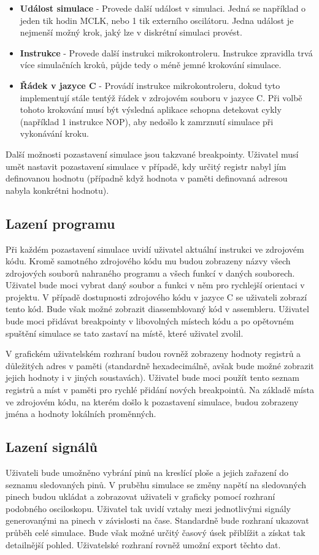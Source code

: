 \begin{itemize}
\item \textbf{Událost simulace} - Provede další událost v simulaci. Jedná se například o jeden tik hodin MCLK, nebo 1 tik externího oscilátoru. Jedna událost je nejmenší možný krok, jaký lze v diskrétní simulaci provést.
\item \textbf{Instrukce} - Provede další instrukci mikrokontroleru. Instrukce zpravidla trvá více simulačních kroků, půjde tedy o méně jemné krokování simulace.
\item \textbf{Řádek v jazyce C} - Provádí instrukce mikrokontroleru, dokud tyto implementují stále tentýž řádek v zdrojovém souboru v jazyce C. Při volbě tohoto krokování musí být výsledná aplikace schopna detekovat cykly (například 1 instrukce NOP), aby nedošlo k zamrznutí simulace při vykonávání kroku.
\end{itemize}

Další možnosti pozastavení simulace jsou takzvané breakpointy. Uživatel musí umět nastavit pozastavení simulace v případě, kdy určitý registr nabyl jím definovanou hodnotu (případně když hodnota v paměti definovaná adresou nabyla konkrétni hodnotu).

\subsection{Lazení programu}

Při každém pozastavení simulace uvidí uživatel aktuální instrukci ve zdrojovém kódu. Kromě samotného zdrojového kódu mu budou zobrazeny názvy všech zdrojových souborů nahraného programu a všech funkcí v daných souborech. Uživatel bude moci vybrat daný soubor a funkci v něm pro rychlejší orientaci v projektu. V případě dostupnosti zdrojového kódu v jazyce C se uživateli zobrazí tento kód. Bude však možné zobrazit diassemblovaný kód v assembleru. Uživatel bude moci přidávat breakpointy v libovolných místech kódu a po opětovném spuštění simulace se tato zastaví na místě, které uživatel zvolil.

V grafickém uživatelském rozhraní budou rovněž zobrazeny hodnoty registrů a důležitých adres v paměti (standardně hexadecimálně, avšak bude možné zobrazit jejich hodnoty i v jiných soustavách). Uživatel bude moci použít tento seznam registrů a míst v paměti pro rychlé přidání nových breakpointů. Na základě místa ve zdrojovém kódu, na kterém došlo k pozastavení simulace, budou zobrazeny jména a hodnoty lokálních proměnných.

\subsection{Lazení signálů}

Uživateli bude umožněno vybrání pinů na kreslící ploše a jejich zařazení do seznamu sledovaných pinů. V pruběhu simulace se změny napětí na sledovaných pinech budou ukládat a zobrazovat uživateli v graficky pomocí rozhraní podobného osciloskopu. Uživatel tak uvidí vztahy mezi jednotlivými signály generovanými na pinech v závislosti na čase. Standardně bude rozhraní ukazovat průběh celé simulace. Bude však možné určitý časový úsek přiblížit a získat tak detailnější pohled. Uživatelské rozhraní rovněž umožní export těchto dat.
